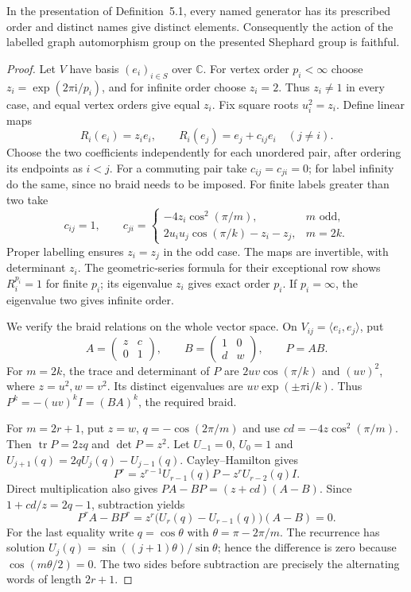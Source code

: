 \begin{proposition}\label{S-prop:shephard}
In the presentation of Definition~5.1, every named generator has its
prescribed order and distinct names give distinct elements. Consequently
the action of the labelled graph automorphism group on the presented
Shephard group is faithful.
\end{proposition}
\begin{proof}
Let $V$ have basis $(e_i)_{i\in S}$ over $\mathbb C$. For vertex order
$p_i<\infty$ choose $z_i=\exp(2\pi\mathrm i/p_i)$, and for infinite
order choose $z_i=2$. Thus $z_i\ne1$ in every case, and equal vertex
orders give equal $z_i$. Fix square roots $u_i^2=z_i$.
Define linear maps
\[
 R_i(e_i)=z_i e_i,\qquad R_i(e_j)=e_j+c_{ij}e_i\quad(j\ne i).
\]
Choose the two coefficients independently for each unordered pair,
after ordering its endpoints as $i<j$. For a commuting pair take
$c_{ij}=c_{ji}=0$; for label infinity do the same, since no braid
needs to be imposed. For finite labels greater than two take
\[
 c_{ij}=1,\qquad c_{ji}=
 \begin{cases}
 -4z_i\cos^2(\pi/m),&m\text{ odd},\\
 2u_i u_j\cos(\pi/k)-z_i-z_j,&m=2k.
 \end{cases}
\]
Proper labelling ensures $z_i=z_j$ in the odd case.
The maps are invertible, with determinant $z_i$. The geometric-series
formula for their exceptional row shows $R_i^{p_i}=1$ for finite $p_i$;
its eigenvalue $z_i$ gives exact order $p_i$. If $p_i=\infty$, the
eigenvalue two gives infinite order.

We verify the braid relations on the whole vector space. On
$V_{ij}=\langle e_i,e_j\rangle$, put
\[
 A=\begin{pmatrix}z&c\\0&1\end{pmatrix},\qquad
 B=\begin{pmatrix}1&0\\d&w\end{pmatrix},\qquad P=AB.
\]
For $m=2k$, the trace and determinant of $P$ are
$2uv\cos(\pi/k)$ and $(uv)^2$, where $z=u^2,w=v^2$.
Its distinct eigenvalues are $uv\exp(\pm\pi\mathrm i/k)$.
Thus $P^k=-(uv)^kI=(BA)^k$, the required braid.

For $m=2r+1$, put $z=w$, $q=-\cos(2\pi/m)$ and use
$cd=-4z\cos^2(\pi/m)$. Then $\operatorname{tr}P=2zq$ and
$\det P=z^2$. Let $U_{-1}=0$, $U_0=1$ and
$U_{j+1}(q)=2qU_j(q)-U_{j-1}(q)$. Cayley--Hamilton gives
\[
 P^r=z^{r-1}U_{r-1}(q)P-z^rU_{r-2}(q)I.
\]
Direct multiplication also gives
$PA-BP=(z+cd)(A-B)$. Since $1+cd/z=2q-1$, subtraction yields
\[
 P^rA-BP^r=z^r\bigl(U_r(q)-U_{r-1}(q)\bigr)(A-B)=0.
\]
For the last equality write $q=\cos\theta$ with
$\theta=\pi-2\pi/m$. The recurrence has solution
$U_j(q)=\sin((j+1)\theta)/\sin\theta$; hence the difference is
zero because $\cos(m\theta/2)=0$. The two sides before subtraction
are precisely the alternating words of length $2r+1$.


\end{proof}
